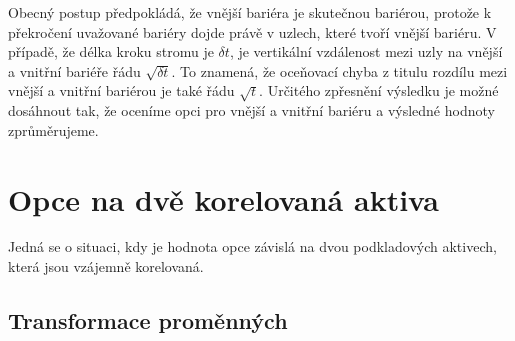 \documentclass[a4paper]{book}
\begin{document}
Obecný postup předpokládá, že vnější bariéra je skutečnou bariérou, protože k překročení uvažované bariéry dojde právě v uzlech, které tvoří vnější bariéru. V případě, že délka kroku stromu je $\delta t$, je vertikální vzdálenost mezi uzly na vnější a vnitřní bariéře řádu $\sqrt{\delta t}$. To znamená, že oceňovací chyba z titulu rozdílu mezi vnější a vnitřní bariérou je také řádu $\sqrt{t}$. Určitého zpřesnění výsledku je možné dosáhnout tak, že oceníme opci pro vnější a vnitřní bariéru a výsledné hodnoty zprůměrujeme. 

\section{Opce na dvě korelovaná aktiva}

Jedná se o situaci, kdy je hodnota opce závislá na dvou podkladových aktivech, která jsou vzájemně korelovaná. 

\subsection{Transformace proměnných}
\end{document}
